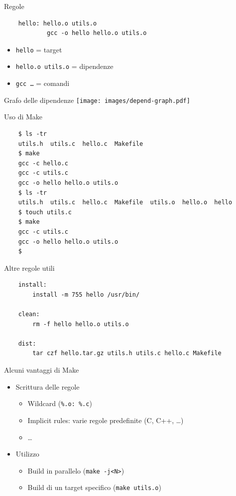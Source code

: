 \documentclass[xetex,table]{beamer}
\begin{document}
\begin{frame}[fragile]{Regole}
  \begin{verbatim}
    hello: hello.o utils.o
            gcc -o hello hello.o utils.o
  \end{verbatim}

  \begin{itemize}
  \item \texttt{hello} = target
  \item \texttt{hello.o utils.o} = dipendenze
  \item \texttt{gcc \dots} = comandi
  \end{itemize}
\end{frame}

\begin{frame}{Grafo delle dipendenze}
  \center\texttt{[image: images/depend-graph.pdf]}
\end{frame}

\begin{frame}[fragile]{Uso di Make}
  \begin{verbatim}
    $ ls -tr
    utils.h  utils.c  hello.c  Makefile
    $ make
    gcc -c hello.c
    gcc -c utils.c
    gcc -o hello hello.o utils.o
    $ ls -tr
    utils.h  utils.c  hello.c  Makefile  utils.o  hello.o  hello
    $ touch utils.c
    $ make
    gcc -c utils.c
    gcc -o hello hello.o utils.o
    $
  \end{verbatim}
\end{frame}

\begin{frame}[fragile]{Altre regole utili}
  \begin{verbatim}
    install:
        install -m 755 hello /usr/bin/

    clean:
        rm -f hello hello.o utils.o

    dist:
        tar czf hello.tar.gz utils.h utils.c hello.c Makefile
  \end{verbatim}
\end{frame}

\begin{frame}{Alcuni vantaggi di Make}
  \begin{itemize}
  \item Scrittura delle regole
    \begin{itemize}
    \item Wildcard (\texttt{\%.o: \%.c})
    \item Implicit rules: varie regole predefinite (C, C++, \dots)
    \item \dots
    \end{itemize}
  \item Utilizzo
    \begin{itemize}
    \item Build in parallelo (\texttt{make -j<N>})
    \item Build di un target specifico (\texttt{make utils.o})
    \end{itemize}
  \end{itemize}
\end{frame}
\end{document}
